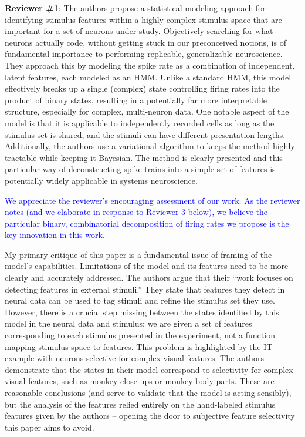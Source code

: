 \documentclass[12pt,a4paper]{article}
\newcommand{\edit}[1]{\textcolor{blue}{#1}}
\begin{document}
{\bf Reviewer \#1}: The authors propose a statistical modeling approach for identifying stimulus features within a highly complex stimulus space that are important for a set of neurons under study. Objectively searching for what neurons actually code, without getting stuck in our preconceived notions, is of fundamental importance to performing replicable, generalizable neuroscience. They approach this by modeling the spike rate as a combination of independent, latent features, each modeled as an HMM. Unlike a standard HMM, this model effectively breaks up a single (complex) state controlling firing rates into the product of binary states, resulting in a potentially far more interpretable structure, especially for complex, multi-neuron data. One notable aspect of the model is that it is applicable to independently recorded cells as long as the stimulus set is shared, and the stimuli can have different presentation lengths. Additionally, the authors use a variational algorithm to keeps the method highly tractable while keeping it Bayesian. The method is clearly presented and this particular way of deconstructing spike trains into a simple set of features is potentially widely applicable in systems neuroscience.

\edit{We appreciate the reviewer's encouraging assessment of our work. As the reviewer notes (and we elaborate in response to Reviewer 3 below), we believe the particular binary, combinatorial decomposition of firing rates we propose is the key innovation in this work.}

My primary critique of this paper is a fundamental issue of framing of the model’s capabilities. Limitations of the model and its features need to be more clearly and accurately addressed. The authors argue that their “work focuses on detecting features in external stimuli.” They state that features they detect in neural data can be used to tag stimuli and refine the stimulus set they use. However, there is a crucial step missing between the states identified by this model in the neural data and stimulus: we are given a set of features corresponding to each stimulus presented in the experiment, not a function mapping stimulus space to features. This problem is highlighted by the IT example with neurons selective for complex visual features. The authors demonstrate that the states in their model correspond to selectivity for complex visual features, such as monkey close-ups or monkey body parts. These are reasonable conclusions (and serve to validate that the model is acting sensibly), but the analysis of the features relied entirely on the hand-labeled stimulus features given by the authors – opening the door to subjective feature selectivity this paper aims to avoid.
\end{document}
